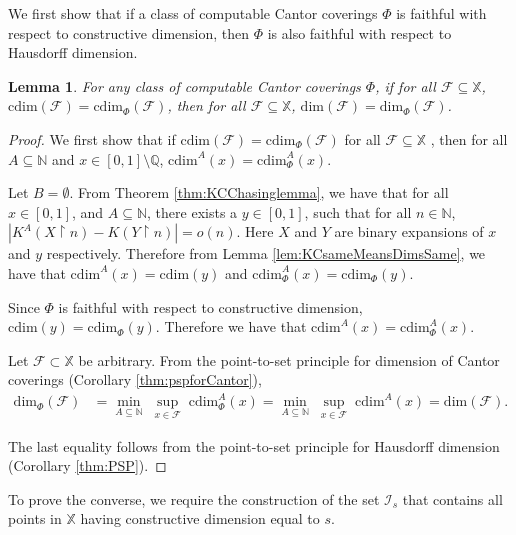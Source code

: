 \documentclass[11pt]{article}
\newtheorem{lemma}{Lemma}
\newcommand{\restr}{\upharpoonright}
\newcommand{\N}{\mathbb{N}}
\newcommand{\Q}{\mathbb{Q}}
\newcommand{\cdim}{\mathrm{cdim}}
\renewcommand{\dim}{{\mathrm{dim}}}
\newcommand{\F}{{\mathcal{F}}}
\newcommand{\X}{{\mathbb{X}}}
\renewcommand{\F}{\mathcal{F}}
\newcommand{\x}{x}
\begin{document}
We first show that if a class of computable Cantor coverings $\Phi$ is faithful with respect to constructive
dimension, then $\Phi$ is also faithful with respect to Hausdorff
dimension.

\begin{lemma} \label{lem:Cantor1}
	For any class of computable Cantor coverings $\Phi$, if for all $\F \subseteq
	\X$, $\cdim(\F) = \cdim_\Phi(\F)$, then for all $\F \subseteq \X$,
	$\dim(\F) = \dim_\Phi(\F)$.
\end{lemma}

\begin{proof} 
	
	We first show that if $\cdim(\F) = \cdim_\Phi(\F)$ for all $\F
	\subseteq \X$ , then for all $A \subseteq \N$ and $\x \in [0,1]
	\setminus \Q$, $\cdim^A(\x) = \cdim^A_\Phi(\x)$.  
	
	Let $B = \emptyset$. From Theorem \ref{thm:KCChasinglemma}, we have
	that for all  $\x \in [0,1]$, and $A \subseteq \N$, there
	exists a $y \in [0,1]$,  such that for all $n \in \N$,
	$|K^A(X \restr n) - K(Y \restr n)| = o(n)$. 
	Here $X$ and $Y$ are binary expansions of $x$ and $y$ respectively.
	Therefore from Lemma \ref{lem:KCsameMeansDimsSame}, we have
	that $\cdim^A(x) = \cdim(y)$ and $\cdim^A_\Phi(x) =
	\cdim_{\Phi}(y)$.
	
	Since $\Phi$ is faithful with respect to constructive
	dimension,   $\cdim(y) = \cdim_\Phi(y)$. 
	Therefore we have that $\cdim^A(x) = \cdim_\Phi^A(x)$.
	
	Let $\F \subset \X$ be arbitrary. From the
	point-to-set principle for dimension of Cantor coverings
	(Corollary \ref{thm:pspforCantor}), 
	\begin{align*}
		\dim_\Phi(\mathcal{F}) &= \min\limits_{A \subseteq \N} \;
		\sup\limits_{\x \in \mathcal{F}} \; \cdim^A_\Phi(\x) = \min\limits_{A \subseteq \N} \; \sup\limits_{\x \in \mathcal{F}} \; \cdim^A(\x)= \dim(\F).
	\end{align*}
	
	
	The last equality follows from the point-to-set principle for
	Hausdorff dimension (Corollary \ref{thm:PSP}). 
\end{proof}

To prove the converse, we require the construction of the set $\mathcal{I}_s$ that contains all points in $\X$ having constructive dimension equal to $s$.
\end{document}
